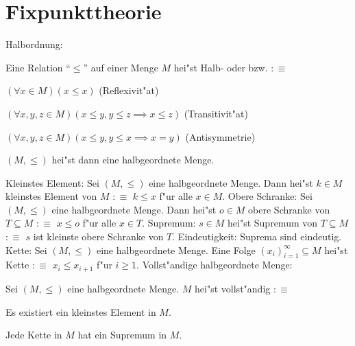 \section{Fixpunkttheorie}
 Halbordnung:{
  Eine Relation ``$\le$'' auf einer Menge $M$ 
  hei"st Halb- oder  bzw.
   $:\equiv$
  \begin{stmts}
    \item $(\forall x\in M)(x\le x)$ (Reflexivit"at)
    \item $(\forall x,y,z\in M)(x\le y,y\le z\implies x\le z)$ (Transitivit"at)
    \item $(\forall x,y,z\in M)(x\le y,y\le x\implies x=y)$ (Antisymmetrie)
    \end{stmts}
  $(M,\le)$ hei"st dann eine halbgeordnete Menge.
  }
 Kleinstes Element:{
  Sei $(M,\le)$ eine halbgeordnete Menge. Dann hei"st $k\in M$ kleinstes
  Element von $M$ $:\equiv$ $k\le x$ f"ur alle $x\in M$.
  }
 Obere Schranke:{
  Sei $(M,\le)$ eine halbgeordnete Menge. Dann hei"st $o\in M$ obere Schranke
  von $T\subseteq M$ $:\equiv$ $x\le o$ f"ur alle $x\in T$.
  }
 Supremum:{
  $s\in M$ hei"st Supremum von $T\subseteq M$ $:\equiv$ $s$ ist kleinste
  obere Schranke von $T$.
  }
\remark Eindeutigkeit:{
  Suprema sind eindeutig.
  }
 Kette:{
  Sei $(M,\le)$ eine halbgeordnete Menge. Eine Folge $(x_i)_{i=1}^\infty\subseteq M$
  hei"st Kette $:\equiv$ $x_i\le x_{i+1}$ f"ur $i\ge 1$.
  }
 Vollst"andige halbgeordnete Menge:{
  Sei $(M,\le)$ eine halbgeordnete Menge. $M$ hei"st vollst"andig $:\equiv$
  \begin{stmts}
    \item Es existiert ein kleinstes Element in $M$.
    \item Jede Kette in $M$ hat ein Supremum in $M$.
    \end{stmts}
  }
